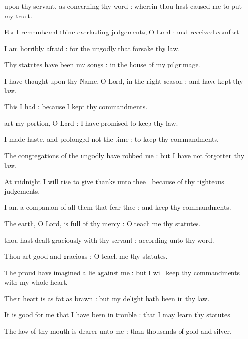  upon thy servant, as concerning thy word : wherein thou hast caused me to put my trust.\par
{}
For I remembered thine everlasting judgements, O Lord : and received comfort.\par
{}I am horribly afraid : for the ungodly that forsake thy law.\par
{}Thy statutes have been my songs : in the house of my pilgrimage.\par
{}I have thought upon thy Name, O Lord, in the night-season : and have kept thy law.\par
{}This I had : because I kept thy commandments.\par

 art my portion, O Lord : I have promised to keep thy law.\par
{}
I made haste, and prolonged not the time : to keep thy commandments.\par
{}The congregations of the ungodly have robbed me : but I have not forgotten thy law.\par
{}At midnight I will rise to give thanks unto thee : because of thy righteous judgements.\par
{}I am a companion of all them that fear thee : and keep thy commandments.\par
{}The earth, O Lord, is full of thy mercy : O teach me thy statutes.\par

 thou hast dealt graciously with thy servant : according unto thy word.\par
{}
Thou art good and gracious : O teach me thy statutes.\par
{}The proud have imagined a lie against me : but I will keep thy commandments with my whole heart.\par
{}Their heart is as fat as brawn : but my delight hath been in thy law.\par
{}It is good for me that I have been in trouble : that I may learn thy statutes.\par
{}The law of thy mouth is dearer unto me : than thousands of gold and silver.\par


